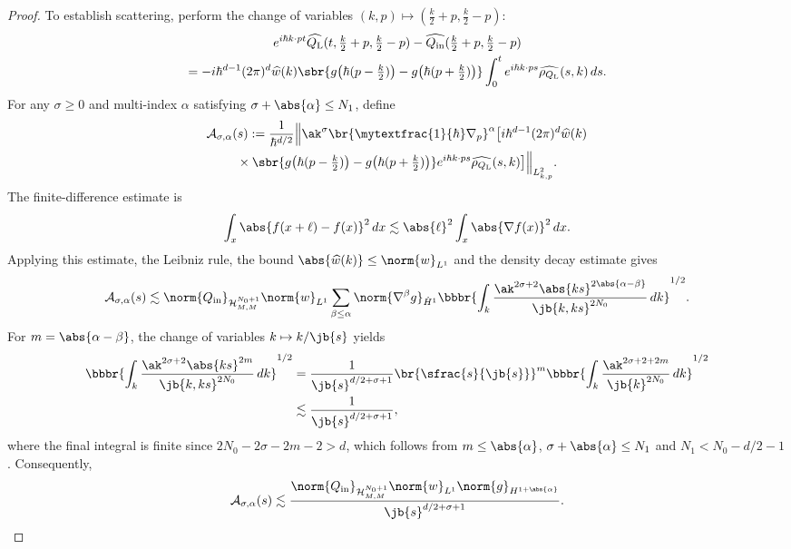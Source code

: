\begin{proof}
To establish scattering, perform the change of variables $(k,p)\mapsto(\frac{k}{2}+p,\frac{k}{2}-p)$:\vspace*{-3pt}
\begin{multline*}
e^{i\hbar k\cdot p t}\widehat {Q_{\mathrm{L}}}(t,\tfrac{k}{2}+p,\tfrac{k}{2}-p)-\widehat{Q_{\mathrm{in}}}(\tfrac{k}{2}+p,\tfrac{k}{2}-p)\\
=-i\hbar^{d-1}(2\pi)^d\widehat w(k)\sbr{g\big(\hbar (p-\tfrac{k}{2})\big)-g\big(\hbar(p+ \tfrac{k}{2})\big)}\int_0^te^{i\hbar k\cdot ps}\widehat {\rho_{Q_{\mathrm{L}}}}(s,k)\,ds.
\end{multline*}
For any $\sigma\geq0$ and multi-index $\alpha$ satisfying $\sigma+\abs{\alpha}\leq N_1$, define\vspace*{-3pt}
\begin{multline*}
\mathcal A_{\sigma,\alpha}(s):=\frac{1}{\hbar^{d/2}}\Bigl\|\ak^\sigma\br{\mytextfrac{1}{\hbar}\nabla_p}^{\alpha}\big[i\hbar^{d-1}(2\pi)^d\widehat w(k)\\
{}\times\sbr{g\big(\hbar(p-\tfrac{k}{2})\big)-g\big(\hbar(p+\tfrac{k}{2})\big)}e^{i\hbar k\cdot ps}\widehat{\rho_{Q_{\mathrm{L}}}}(s,k)\big]\Bigr\|_{L^2_{k,p}}.
\end{multline*}
The finite-difference estimate is\vspace*{-3pt}
\begin{align*}
\int_x\abs{f(x+\ell)-f(x)}^2\,dx\lesssim\abs{\ell}^2\int_x\abs{\nabla f(x)}^2\,dx.
\end{align*}
Applying this estimate, the Leibniz rule, the bound $\abs{\widehat w(k)}\leq\norm{w}_{L^1}$ and the density decay estimate gives\vspace*{-3pt}
\begin{align*}
\mathcal A_{\sigma,\alpha}(s)\lesssim\norm{Q_{\mathrm{in}}}_{\mathcal H^{N_0+1}_{M,M}}\norm{w}_{L^1}\sum_{\beta\leq\alpha}\norm{\nabla^\beta g}_{\dot H^1}\bbbr{\int_k\frac{\ak^{2\sigma+2}\abs{ks}^{2\abs{\alpha-\beta}}}{\jb{k,ks}^{2N_0}}\,dk}^{1/2}.
\end{align*}
For $m=\abs{\alpha-\beta}$, the change of variables $k\mapsto k/\jb{s}$ yields
\begin{align*}
\bbbr{\int_k\frac{\ak^{2\sigma+2}\abs{ks}^{2m}}{\jb{k,ks}^{2N_0}}\,dk}^{1/2}&=\frac{1}{\jb{s}^{d/2+\sigma+1}}\br{\sfrac{s}{\jb{s}}}^{m}\bbbr{\int_k\frac{\ak^{2\sigma+2+2m}}{\jb{k}^{2N_0}}\,dk}^{1/2}\\
&\lesssim\frac{1}{\jb{s}^{d/2+\sigma+1}},
\end{align*}
where the final integral is finite since $2N_0-2\sigma-2m-2>d$, which follows from $m\leq\abs{\alpha}$, $\sigma+\abs{\alpha}\leq N_1$ and $N_1<N_0-d/2-1$. Consequently,
\begin{align}\label{linearscatteringintegrand}
\mathcal A_{\sigma,\alpha}(s)\lesssim\frac{\norm{Q_{\mathrm{in}}}_{\mathcal H^{N_0+1}_{M,M}}\norm{w}_{L^1}\norm{g}_{H^{1+\abs{\alpha}}}}{\jb{s}^{d/2+\sigma+1}}.
\end{align}


\end{proof}
